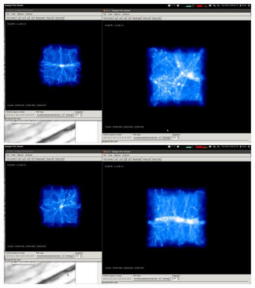 \includegraphics[scale=0.2]{gendrkl1r2_1c_1/1.png} \\
\includegraphics[scale=0.2]{gendrkl1r2_1c_1/2.png} 

